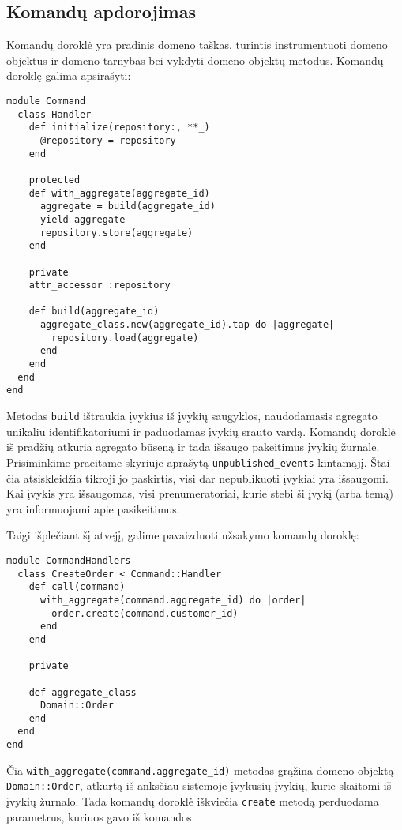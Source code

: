 \subsection{Komandų apdorojimas}

Komandų doroklė yra pradinis domeno taškas, turintis instrumentuoti domeno objektus ir domeno tarnybas bei vykdyti domeno objektų metodus. Komandų doroklę galima apsirašyti:

\begin{lstlisting}
module Command
  class Handler
    def initialize(repository:, **_)
      @repository = repository
    end

    protected
    def with_aggregate(aggregate_id)
      aggregate = build(aggregate_id)
      yield aggregate
      repository.store(aggregate)
    end

    private
    attr_accessor :repository

    def build(aggregate_id)
      aggregate_class.new(aggregate_id).tap do |aggregate|
        repository.load(aggregate)
      end
    end
  end
end
\end{lstlisting}

Metodas \lstinline|build| ištraukia įvykius iš įvykių saugyklos, naudodamasis agregato unikaliu identifikatoriumi ir paduodamas įvykių srauto vardą. Komandų doroklė iš pradžių atkuria agregato būseną ir tada išsaugo pakeitimus įvykių žurnale. Prisiminkime praeitame skyriuje aprašytą \lstinline|unpublished_events| kintamąjį. Štai čia atsiskleidžia tikroji jo paskirtis, visi dar nepublikuoti įvykiai yra išsaugomi. Kai įvykis yra išsaugomas, visi prenumeratoriai, kurie stebi ši įvykį (arba temą) yra informuojami apie pasikeitimus.

Taigi išplečiant šį atvejį, galime pavaizduoti užsakymo komandų doroklę:

\begin{lstlisting}
module CommandHandlers
  class CreateOrder < Command::Handler
    def call(command)
      with_aggregate(command.aggregate_id) do |order|
        order.create(command.customer_id)
      end
    end

    private

    def aggregate_class
      Domain::Order
    end
  end
end
\end{lstlisting}

Čia \lstinline|with_aggregate(command.aggregate_id)| metodas grąžina domeno objektą \lstinline|Domain::Order|, atkurtą iš anksčiau sistemoje įvykusių įvykių, kurie skaitomi iš įvykių žurnalo. Tada komandų doroklė iškviečia \lstinline|create| metodą perduodama parametrus, kuriuos gavo iš komandos.

